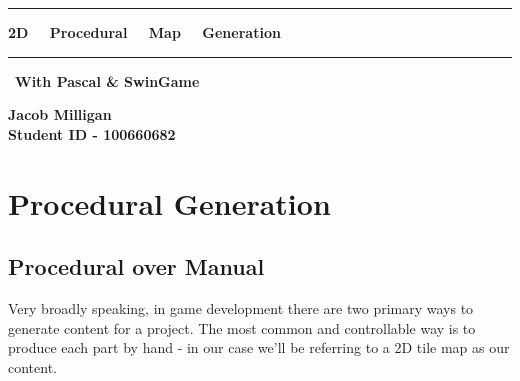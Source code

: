 \documentclass{article}
\begin{document}
\begin{titlepage}

\centering
\vspace*{0.3cm}

\Huge
\begin{mdframed}[backgroundcolor=lightgray,linecolor=lightgray]
\centering
\vspace{7mm}
\rule{\textwidth}{2mm}

\textbf{2D \ \ Procedural \ \ Map \ \ Generation} 

\vspace{3mm}

\rule{\textwidth}{2mm}
\huge
\vfill
\
\textbf{With Pascal \& SwinGame}
\vspace{7mm}
\end{mdframed}

\vfill


\vfill
\large
\textbf{Jacob Milligan \\ \small Student ID - 100660682}

\end{titlepage}

\clearpage

\tableofcontents

\clearpage

\section{Procedural Generation}

\subsection{Procedural over Manual}


Very broadly speaking, in game development there are two primary ways to generate content for a project. The most common and controllable way is to produce each part by hand - in our case we'll be referring to a 2D tile map as our content.
		
\end{document}

